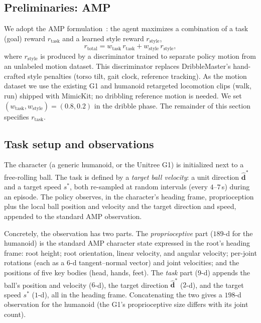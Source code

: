 \documentclass[10pt,twocolumn,letterpaper]{article}
\begin{document}
\subsection{Preliminaries: AMP}
We adopt the AMP formulation~\cite{peng2021amp}: the agent maximizes a 
combination of a task (goal) reward $r_\text{task}$ and a learned style reward
$r_\text{style}$,
\begin{equation}
    r_\text{total} = w_\text{task}\, r_\text{task} + w_\text{style}\, r_\text{style},
\end{equation}
where $r_\text{style}$ is produced by a discriminator trained to separate policy
motion from an unlabeled motion dataset. This discriminator replaces
DribbleMaster's hand-crafted style penalties (torso tilt, gait clock, reference
tracking). As the motion dataset we use the existing G1 and humanoid retargeted
locomotion clips (walk, run) shipped with MimicKit; no dribbling reference
motion is needed. We set $(w_\text{task},w_\text{style})=(0.8,0.2)$ in the
dribble phase. The remainder of this section specifies $r_\text{task}$.

\subsection{Task setup and observations}
The character (a generic humanoid, or the Unitree G1) is initialized next to a
free-rolling ball. The task is defined by a \emph{target ball velocity}: a unit
direction $\hat{\mathbf{d}}^*$ and a target speed $s^*$, both re-sampled at
random intervals (every $4$--$7$\,s) during an episode. The policy observes, in
the character's heading frame, proprioception plus the local ball position and
velocity and the target direction and speed, appended to the standard AMP
observation.

Concretely, the observation has two parts. The \emph{proprioceptive} part
($189$-d for the humanoid) is the standard AMP character state expressed in the
root's heading frame: root height; root orientation, linear velocity, and
angular velocity; per-joint rotations (each as a $6$-d tangent--normal vector)
and joint velocities; and the positions of five key bodies (head, hands, feet).
The \emph{task} part ($9$-d) appends the ball's position and velocity ($6$-d),
the target direction $\hat{\mathbf{d}}^*$ ($2$-d), and the target speed $s^*$
($1$-d), all in the heading frame. Concatenating the two gives a $198$-d
observation for the humanoid (the G1's proprioceptive size differs with its
joint count).
\end{document}
